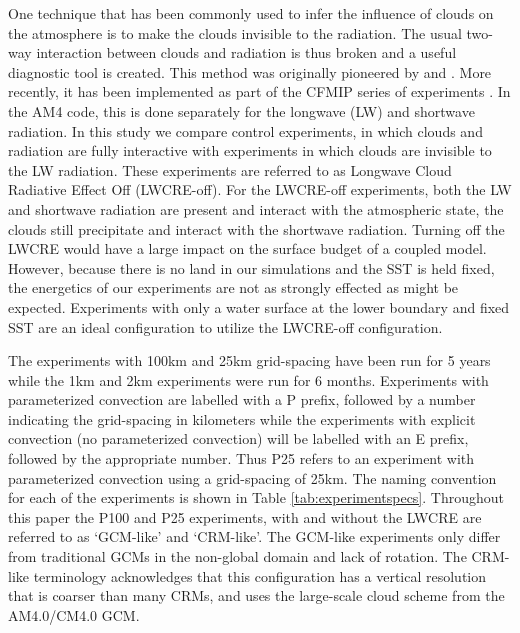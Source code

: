 \documentclass[draft]{agujournal2019}
\begin{document}
One technique that has been commonly used to infer the influence of clouds on the atmosphere is to make the clouds invisible to the radiation.  
The usual two-way interaction between clouds and radiation is thus broken and a useful diagnostic tool is created.  
This method was originally pioneered by  and .  
More recently, it has been implemented as part of the CFMIP series of experiments \cite{Stevens_etal_2012, Webb_etal_2017}.
In the AM4 code, this is done separately for the longwave (LW) and shortwave radiation.  
In this study we compare control experiments, in which clouds and radiation are fully interactive with experiments in which clouds are invisible to the LW radiation.  
These experiments are referred to as Longwave Cloud Radiative Effect Off (LWCRE-off).  
For the LWCRE-off experiments, both the LW and shortwave radiation are present and interact with 
the atmospheric state, the clouds still precipitate and interact with the shortwave radiation.   
Turning off the LWCRE would have a large impact on the surface budget of a coupled model.  
However, because there is no land in our simulations and the SST is held fixed, the energetics of our experiments are not as
strongly effected as might be expected.  Experiments with only a water surface at the lower boundary and 
fixed SST are an ideal configuration to utilize the LWCRE-off configuration. 

The experiments with 100km and 25km grid-spacing have been run for 5 years while the 
1km and 2km experiments were run for 6 months.  Experiments with parameterized convection are labelled with a P prefix, followed
by a number indicating the grid-spacing in kilometers while the experiments with explicit convection (no parameterized convection) will be 
labelled with an E prefix, followed by the appropriate number.  Thus P25 refers to an experiment with parameterized convection using a 
grid-spacing of 25km. 
The naming convention for each of the experiments is shown in Table \ref{tab:experimentspecs}.   
Throughout this paper the P100 and P25 experiments, with and without the LWCRE are referred to as `GCM-like' and
`CRM-like'.  The GCM-like experiments only differ from traditional GCMs in the non-global domain and lack of rotation.  
The CRM-like terminology acknowledges that this configuration 
has a vertical resolution that is coarser than many CRMs, and uses the large-scale cloud scheme from the AM4.0/CM4.0 GCM.  
  
\end{document}
